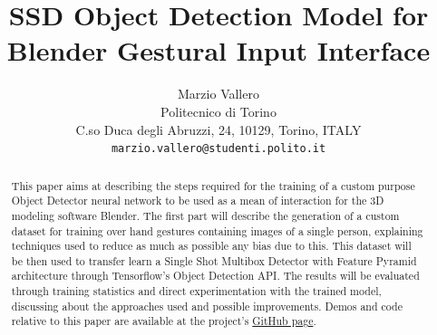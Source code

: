 \documentclass[10pt,twocolumn,letterpaper]{article}
\begin{document}
\title{SSD Object Detection Model for Blender Gestural Input Interface}

\author{Marzio Vallero\\
Politecnico di Torino\\
C.so Duca degli Abruzzi, 24, 10129, Torino, ITALY\\
{\tt\small marzio.vallero@studenti.polito.it}
}

\maketitle

\begin{abstract}
This paper aims at describing the steps required for the training of a custom purpose Object Detector neural network to be used as a mean of interaction for the 3D modeling software Blender. The first part will describe the generation of a custom dataset for training over hand gestures containing images of a single person, explaining techniques used to reduce as much as possible any bias due to this.\linebreak
This dataset will be then used to transfer learn a Single Shot Multibox Detector with Feature Pyramid architecture through Tensorflow's Object Detection API.
The results will be evaluated through training statistics and direct experimentation with the trained model, discussing about the approaches used and possible improvements.
Demos and code relative to this paper are available at the project's \href{https://github.com/MarzioVallero/ML-Based-Blender-Gestural-Input-Interface}{GitHub page}.
\end{abstract}

\end{document}
